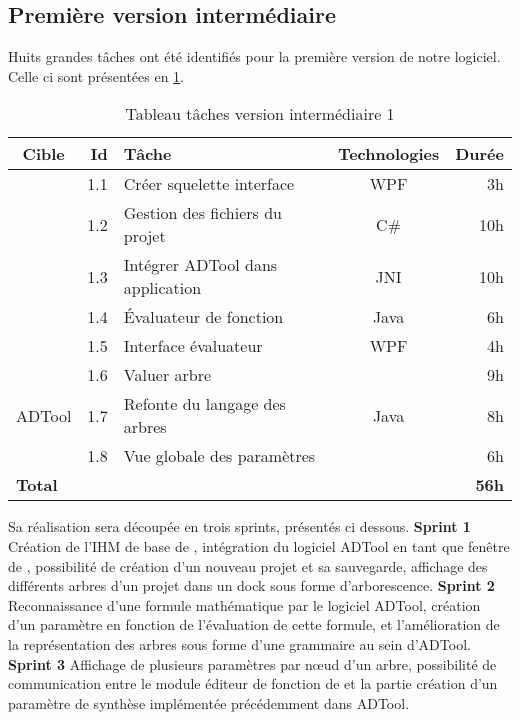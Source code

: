 	\subsection{Première version intermédiaire}
		Huits grandes tâches ont été identifiés pour la première version de notre logiciel. Celle ci sont présentées en \ttable{} \ref{tab:taches_units_1}. 
		\begin{table}[h]
			\centering
			\begin{tabular}{|c|r|l|c|r|}
				\hline
				\textbf{Cible} & \textbf{Id} & \textbf{Tâche} & \textbf{Technologies} & \textbf{Durée}\\
				\hline

				\multirow{5}{*}{\glasir{}} & 1.1 & Créer squelette interface & WPF & 3h\\
				\cline{2-5}
				 & 1.2 & Gestion des fichiers du projet & C\# & 10h\\
				\cline{2-5}
				 & 1.3 & Intégrer ADTool dans application & JNI & 10h\\
				\cline{2-5}
				 & 1.4 & \'Evaluateur de fonction & Java & 6h\\
				\cline{2-5}
				 & 1.5 & Interface évaluateur & WPF & 4h\\
				\hline

				\multirow{3}{*}{ADTool} & 1.6 & Valuer arbre & \multirow{3}{*}{Java} & 9h\\
				\cline{2-3} \cline{5-5}
				 & 1.7 & Refonte du langage des arbres & & 8h\\
				\cline{2-3} \cline{5-5}
				 & 1.8 & Vue globale des paramètres & & 6h\\
				\hline

				\multicolumn{4}{|l|}{\bf Total} & {\bf 56h}\\
				\hline
			\end{tabular}
			\caption{Tableau tâches version intermédiaire 1}
			\label{tab:taches_units_1}
		\end{table}
		Sa réalisation sera découpée en trois sprints, présentés ci dessous.\newline
		\textbf{Sprint 1} Création de l'IHM de base de \glasir{}, intégration du logiciel ADTool en tant que fenêtre de \glasir{}, possibilité de création d'un nouveau projet et sa sauvegarde, affichage des différents arbres d'un projet dans un dock sous forme d'arborescence.\newline
		\textbf{Sprint 2} Reconnaissance d'une formule mathématique par le logiciel ADTool, création d'un paramètre en fonction de l'évaluation de cette formule, et l'amélioration de la représentation des arbres sous forme d'une grammaire au sein d'ADTool.\newline
		\textbf{Sprint 3} Affichage de plusieurs paramètres par nœud d'un arbre, possibilité de communication entre le module éditeur de fonction de \glasir{} et la partie création d'un paramètre de synthèse implémentée précédemment dans ADTool.\newline

